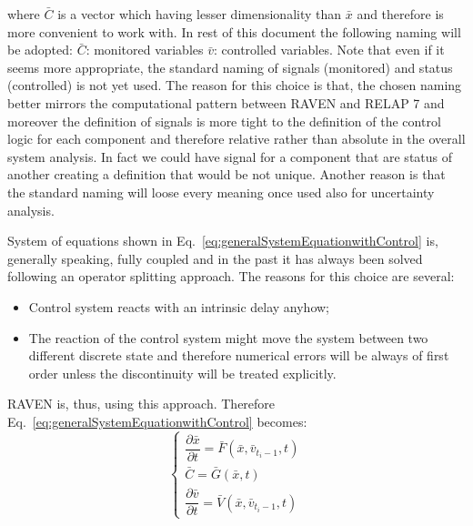 \documentclass{mc2013}
\begin{document}
where 
$\bar{C}$
is a vector which having lesser dimensionality than
$\bar{x}$
and therefore is more convenient to work with. In rest of this document the following naming will be adopted: $\bar{C}$: monitored variables $\bar{v}$:
controlled variables.
Note that even if it seems more appropriate, the standard naming of signals (monitored)
and status (controlled) is not yet used. The reason for this choice is that, the chosen naming better mirrors
the computational pattern between RAVEN and RELAP 7 and moreover the definition of signals is more
tight to the definition of the control logic for each component and therefore relative rather than absolute in
the overall system analysis. In fact we could have signal for a component that are status of another creating
a definition that would be not unique. Another reason is that the standard naming will loose every meaning
once used also for uncertainty analysis.

\label{sec:operatorSplitting}

System of equations shown in Eq.~\ref{eq:generalSystemEquationwithControl} is, generally speaking, fully coupled and in the past it has always been solved following an operator splitting approach. The reasons for this choice are several:
\begin{itemize}
\item Control system reacts with an intrinsic delay anyhow;
\item The reaction of the control system might move the system between two different discrete state and
therefore numerical errors will be always of first order unless the discontinuity will be treated explicitly.
\end{itemize}
RAVEN is, thus, using this approach. Therefore Eq.~\ref{eq:generalSystemEquationwithControl} becomes:
\begin{equation}
\begin{cases} 
\dfrac{\partial \bar{x}}{\partial t} = \bar{F}(\bar{x},\bar{v}_{t_{i}-1},t) \\
\bar{C} = \bar{G}(\bar{x},t) \\ 
\dfrac{\partial \bar{v}}{\partial t} = \bar{V}(\bar{x},\bar{v}_{t_{i}-1},t) 
\end{cases}
\label{eq:generalSystemEquationwithControlSplitting}
\end{equation}
\end{document}
